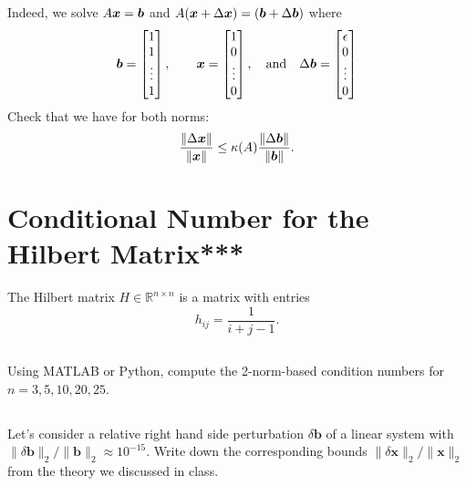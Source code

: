 \documentclass[11pt,letterpaper]{report}
\begin{document}
\subsection{}
Indeed, we solve $A\boldsymbol{x} = \boldsymbol{b}$ and $A(\boldsymbol{x}+\Delta \boldsymbol{x}) = (\boldsymbol{b}+\Delta \boldsymbol{b})$ where
\begin{align*}
    \boldsymbol{b} = \begin{bmatrix}
    1\\1\\\vdots\\1
    \end{bmatrix},\qquad \boldsymbol{x} = \begin{bmatrix}
    1\\0\\\vdots\\0
    \end{bmatrix},\quad \mbox{and} \quad \Delta\boldsymbol{b} = \begin{bmatrix}
    \epsilon\\0\\\vdots\\0
    \end{bmatrix}
\end{align*}
Check that we have for both norms:
\begin{align*}
    \frac{\left\Vert \Delta\boldsymbol{x} \right\Vert}{\left\Vert \boldsymbol{x} \right\Vert} \leq \kappa(A)\frac{\left\Vert \Delta\boldsymbol{b} \right\Vert}{\left\Vert \boldsymbol{b} \right\Vert}.
\end{align*}

\section{Conditional Number for the Hilbert Matrix***}  
The Hilbert matrix $H\in \mathbb R^{n\times n}$ is a matrix with
  entries
  $$
  h_{ij} = \frac{1}{i+j-1}.
  $$ 
\subsection{}
Using MATLAB or Python, compute the 2-norm-based condition
  numbers for $n=3,5,10,20,25$.  
  
\subsection{}
  Let's consider a relative right hand
  side perturbation $\delta\boldsymbol b$ of a linear system with
  $\|\delta\boldsymbol b\|_2/\|\boldsymbol b\|_2\approx
  10^{-15}$. Write down the corresponding bounds $\|\delta\boldsymbol
  x\|_2/\|\boldsymbol x\|_2$ from the theory we discussed in class.
\end{document}
